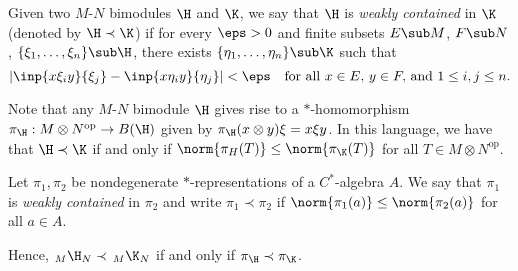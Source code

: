 \documentclass[../main.tex]{subfiles}
\begin{document}
\begin{definition}
    Given two $M$-$N$ bimodules $ \H $ and $ \K $, we say that $ \H $ is \textit{weakly contained} in $ \K $ (denoted by $ \H \prec \K $) if for every $ \eps >0 $ and finite subsets $ E\sub M $, $ F\sub N $, $ \{ \xi_{1}, \ldots, \xi_{n}\}\sub \H $, there exists $ \{ \eta_{1},\ldots, \eta_{n}\}\sub \K $ such that 
    \[
        |\inp{x \xi_{i} y}{\xi_{j}}- \inp{x \eta_{i} y}{\eta_{j}}| < \eps \quad \text{for all }x\in E,\,y\in F,\,\text{and } 1\leq i,j\leq n.
    \]
\end{definition}

Note that any $ M $-$ N $ bimodule $ \H $ gives rise to a $ * $-homomorphism $ \pi_{\H}: M \otimes N^{\text{op}}\to B(\H) $ given by $ \pi_{\H}(x \otimes y) \xi = x \xi y $. In this language, we have that $ \H \prec \K $ if and only if $ \norm{\pi_{H}(T)} \leq \norm{\pi_{\K}(T)} $ for all $ T\in M \otimes N^{\text{op}} $.

\begin{definition}
    Let $ \pi_{1}, \pi_{2} $ be nondegenerate $ * $-representations of a $ C^{*} $-algebra $ A $. We say that $ \pi_{1} $ is \textit{weakly contained} in $ \pi_{2} $ and write $ \pi_{1}\prec \pi_{2}$ if $ \norm{\pi_{1}(a)}\leq \norm{\pi_{2}(a)} $ for all $ a\in A $.
\end{definition}

Hence, $ _M\H_N \prec\, _M\K_N $ if and only if $ \pi_{\H} \prec \pi_{\K} $.


\end{document}
